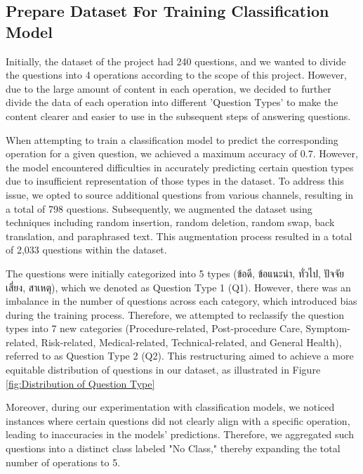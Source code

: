 \documentclass[12pt,oneside,openright,a4paper]{cpe-english-project}
\begin{document}
    \subsection{Prepare Dataset For Training Classification Model}
      \qquad Initially, the dataset of the project had 240 questions, and we wanted to divide the questions into 4 operations according to the scope of this project. However, due to the large amount of content in each operation, we decided to further divide the data of each operation into different 'Question Types' to make the content clearer and easier to use in the subsequent steps of answering questions. \par
      \qquad When attempting to train a classification model to predict the corresponding operation for a given question, we achieved a maximum accuracy of 0.7. However, the model encountered difficulties in accurately predicting certain question types due to insufficient representation of those types in the dataset. To address this issue, we opted to source additional questions from various channels, resulting in a total of 798 questions. Subsequently, we augmented the dataset using techniques including random insertion, random deletion, random swap, back translation, and paraphrased text. This augmentation process resulted in a total of 2,033 questions within the dataset. \par
      \qquad The questions were initially categorized into 5 types \textthai{(ข้อดี, ข้อแนะนำ, ทั่วไป, ปัจจัยเสี่ยง, สาเหตุ)}, which we denoted as Question Type 1 (Q1). However, there was an imbalance in the number of questions across each category, which introduced bias during the training process. Therefore, we attempted to reclassify the question types into 7 new categories (Procedure-related, Post-procedure Care, Symptom-related, Risk-related, Medical-related, Technical-related, and General Health), referred to as Question Type 2 (Q2). This restructuring aimed to achieve a more equitable distribution of questions in our dataset, as illustrated in Figure \ref{fig:Distribution of Question Type} \par
      \qquad Moreover, during our experimentation with classification models, we noticed instances where certain questions did not clearly align with a specific operation, leading to inaccuracies in the models’ predictions. Therefore, we aggregated such questions into a distinct class labeled "No Class," thereby expanding the total number of operations to 5. \par
\end{document}
